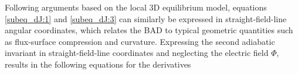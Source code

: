 Following arguments based on the local 3D equilibrium model, \cite{hegna2000local,hegna2015effect,Gerard_2023} equations \eqref{subeq_dJ:1} and \eqref{subeq_dJ:3} can similarly be expressed in straight-field-line angular coordinates, which relates the BAD to typical geometric quantities such as flux-surface compression and curvature. Expressing the second adiabatic invariant in straight-field-line coordinates and neglecting the electric field $\Phi$, results in the following equations for the derivatives
